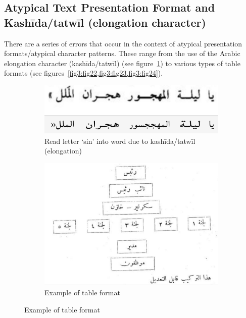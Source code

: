 \subsection{Atypical Text Presentation Format and Kashīda/tatwīl (elongation character)}

There are a series of errors that occur in the context of atypical presentation
formats/atypical character patterns. These range from the use of the Arabic
elongation character (kashīda/tatwīl) (see figure~\ref{fig3:fig21}) to various types of table
formats (see figures~\ref{fig3:fig22,fig3:fig23,fig3:fig24}).

\begin{figure}[!ht]
	\centering
	\begin{subfigure}[b]{0.9\linewidth}
	\centering
	\includegraphics[width=\textwidth]{images/image2.png}
	\caption{Read letter ‘sin’ into word due to kashīda/tatwīl (elongation)}
	\label{fig3:fig21}
	\end{subfigure}

	\begin{subfigure}[b]{0.9\linewidth}
	\centering
	\includegraphics[width=\textwidth]{images/image31.png}
	\caption{Example of table format}
	\label{fig3:fig22}
	\end{subfigure}


\end{figure}

